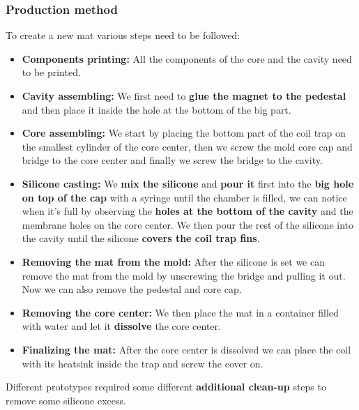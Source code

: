 \subsubsection{Production method}
To create a new mat various steps need to be followed:
\begin{itemize}
    \item \textbf{Components printing: } All the components of the core and the cavity need to be printed.
    \item \textbf{Cavity assembling: } We first need to \textbf{glue the magnet to the pedestal} and then place it inside the hole at the bottom of the big part.
    \item \textbf{Core assembling: } We start by placing the bottom part of the coil trap on the smallest cylinder of the core center, then we screw the mold core cap and bridge to the core center and finally we screw the bridge to the cavity.
    \item \textbf{Silicone casting: } We \textbf{mix the silicone} and \textbf{pour it} first into the \textbf{big hole on top of the cap} with a syringe until the chamber is filled, we can notice when it's full by observing the \textbf{holes at the bottom of the cavity} and the membrane holes on the core center.
    We then pour the rest of the silicone into the cavity until the silicone \textbf{covers the coil trap fins}.
    \item \textbf{Removing the mat from the mold: } After the silicone is set we can remove the mat from the mold by unscrewing the bridge and pulling it out. Now we can also remove the pedestal and core cap.
    \item \textbf{Removing the core center: } We then place the mat in a container filled with water and let it \textbf{dissolve} the core center.
    \item \textbf{Finalizing the mat: } After the core center is dissolved we can place the coil with its heatsink inside the trap and screw the cover on.
\end{itemize}
Different prototypes required some different \textbf{additional clean-up} steps to remove some silicone excess.

